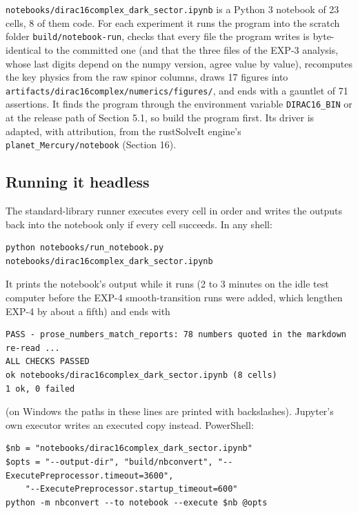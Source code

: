 \documentclass[11pt]{article}
\begin{document}
\texttt{notebook\allowbreak{}s/dirac1\allowbreak{}6complex\allowbreak{}\_dark\_se\allowbreak{}ctor.ipy\allowbreak{}nb} is a Python 3 notebook of 23 cells, 8 of them code. For each experiment it runs the program into the scratch folder \texttt{build/no\allowbreak{}tebook-r\allowbreak{}un}, checks that every file the program writes is byte-identical to the committed one (and that the three files of the EXP-3 analysis, whose last digits depend on the numpy version, agree value by value), recomputes the key physics from the raw spinor columns, draws 17 figures into \texttt{artifact\allowbreak{}s/dirac1\allowbreak{}6complex\allowbreak{}/numeric\allowbreak{}s/figure\allowbreak{}s/}, and ends with a gauntlet of 71 assertions. It finds the program through the environment variable \texttt{DIRAC16\_\allowbreak{}BIN} or at the release path of Section 5.1, so build the program first. Its driver is adapted, with attribution, from the rustSolveIt engine's \texttt{planet\_M\allowbreak{}ercury/n\allowbreak{}otebook} (Section 16).

\subsection{Running it headless}

The standard-library runner executes every cell in order and writes the outputs back into the notebook only if every cell succeeds. In any shell:

\begin{Verbatim}[fontsize=\small]
python notebooks/run_notebook.py notebooks/dirac16complex_dark_sector.ipynb
\end{Verbatim}

It prints the notebook's output while it runs (2 to 3 minutes on the idle test computer before the EXP-4 smooth-transition runs were added, which lengthen EXP-4 by about a fifth) and ends with

\begin{Verbatim}[fontsize=\small]
PASS - prose_numbers_match_reports: 78 numbers quoted in the markdown re-read ...
ALL CHECKS PASSED
ok notebooks/dirac16complex_dark_sector.ipynb (8 cells)
1 ok, 0 failed
\end{Verbatim}

(on Windows the paths in these lines are printed with backslashes). Jupyter's own executor writes an executed copy instead. PowerShell:

\begin{Verbatim}[fontsize=\small]
$nb = "notebooks/dirac16complex_dark_sector.ipynb"
$opts = "--output-dir", "build/nbconvert", "--ExecutePreprocessor.timeout=3600",
    "--ExecutePreprocessor.startup_timeout=600"
python -m nbconvert --to notebook --execute $nb @opts
\end{Verbatim}
\end{document}
